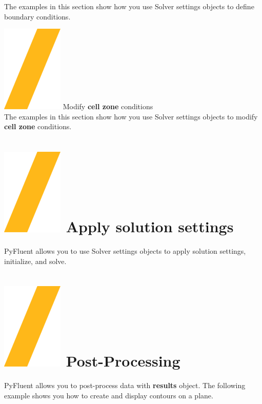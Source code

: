 \documentclass[9pt,landscape]{article}
\begin{document}
\begin{multicols}{3}
{The examples in this section show how you use Solver settings objects to define boundary conditions.

\vfill
{\includegraphics[height=\fontcharht\font`\S]{slash.png}  Modify \textbf{cell zone} conditions} \\
The examples in this section show how you use Solver settings objects to modify \textbf{cell zone} conditions.
\vfill

\vfill
\section{\includegraphics[height=\fontcharht\font`\S]{slash.png}  Apply solution settings}
PyFluent allows you to use Solver settings objects to apply
solution settings, initialize, and solve.


\section{\includegraphics[height=\fontcharht\font`\S]{slash.png}  Post-Processing}
PyFluent allows you to post-process data with \textbf{results} object. The following example shows you how to create and display contours on a plane.

}
\end{multicols}
\end{document}
